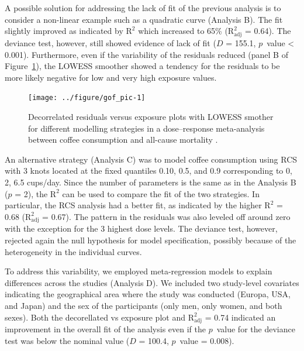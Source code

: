 \documentclass[11pt,a4paper,twoside,openany]{book}\usepackage{knitr}
\begin{document}
{\noindent A possible solution for addressing the lack of fit of the previous analysis is to consider a non-linear example such as a quadratic curve (Analysis B). The fit slightly improved as indicated by \textrm{$\mathrm{R^2}$} which increased to 65\% (\textrm{$\mathrm{R_{\textrm{adj}}^2}$} = 0.64). The deviance test, however, still showed evidence of lack of fit ($D$ = 155.1, $p$~value < 0.001). Furthermore, even if the variability of the residuals reduced (panel B of Figure~\ref{fig:gof_pic}), the LOWESS smoother showed a tendency for the residuals to be more likely negative for low and very high exposure values.

\begin{knitrout}\footnotesize
{}\color{fgcolor}\begin{figure}[ht!]

{\centering \texttt{[image: ../figure/gof\_pic-1]} 

}

\caption[Decorrelated residuals versus exposure plots with LOWESS smother for different modelling strategies in a dose--response meta-analysis between coffee consumption and all-cause mortality \citep{crippa2014coffee}]{Decorrelated residuals versus exposure plots with LOWESS smother for different modelling strategies in a dose--response meta-analysis between coffee consumption and all-cause mortality \citep{crippa2014coffee}.}\label{fig:gof_pic}
\end{figure}


\end{knitrout}

\noindent An alternative strategy (Analysis C) was to model coffee consumption using RCS with 3 knots located at the fixed quantiles 0.10, 0.5, and 0.9 corresponding to 0, 2, 6.5 cups/day. Since the number of parameters is the same as in the Analysis B ($p$ = 2), the \textrm{$\mathrm{R^2}$} can be used to compare the fit of the two strategies. In particular, the RCS analysis had a better fit, as indicated by the higher \textrm{$\mathrm{R^2}$} = 0.68 (\textrm{$\mathrm{R_{\textrm{adj}}^2}$} = 0.67). The pattern in the residuals was also leveled off around zero with the exception for the 3 highest dose levels. The deviance test, however, rejected again the null hypothesis for model specification, possibly because of the heterogeneity in the individual curves. 

\noindent To address this variability, we employed meta-regression models to explain differences across the studies (Analysis D). We included two study-level covariates indicating the geographical area where the study was conducted (Europa, USA, and Japan) and the sex of the participants (only men, only women, and both sexes). Both the decorellated vs exposure plot and \textrm{$\mathrm{R_{\textrm{adj}}^2}$} = 0.74 indicated an improvement in the overall fit of the analysis even if the $p$~value for the deviance test was below the nominal value ($D$ = 100.4, $p$~value = 0.008).

}
\end{document}
